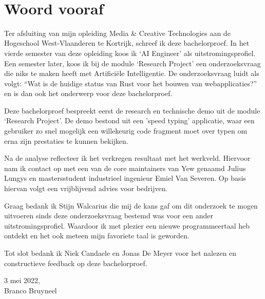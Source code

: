\documentclass[11pt, oneside]{book}
\begin{document}

\clearpage

\thispagestyle{empty}
\ %

\clearpage


\chapter*{Woord vooraf}
Ter afsluiting van mijn opleiding Media \& Creative Technologies aan de Hogeschool West-Vlaanderen
te Kortrijk, schreef ik deze bachelorproef.  In het vierde semester van deze opleiding koos ik ‘AI
Engineer’ als uitstromingsprofiel. Een semester later, koos ik bij de module ‘Research Project’ een
onderzoeksvraag die niks te maken heeft met Artificiële Intelligentie. De onderzoeksvraag luidt als
volgt: \enquote{Wat is de huidige status van Rust voor het bouwen van webapplicaties?} en is dan ook
het onderwerp voor deze bachelorproef. 

Deze bachelorproef bespreekt eerst de research en technische demo uit de module ‘Research Project’.
De demo bestond uit een 'speed typing' applicatie, waar een gebruiker zo snel mogelijk een
willekeurig code fragment moet over typen om erna zijn prestaties te kunnen bekijken. 

Na de analyse reflecteer ik het verkregen resultaat met het werkveld. Hiervoor nam ik contact op met
een van de core maintainers van Yew genaamd Julius Lungys en mastersstudent industrieel ingenieur
Emiel Van Severen. Op basis hiervan volgt een vrijblijvend advies voor bedrijven. 

Graag bedank ik Stijn Walcarius die mij de kans gaf om dit onderzoek te mogen uitvoeren sinds deze
onderzoeksvraag bestemd was voor een ander uitstromingsprofiel. Waardoor ik met plezier een nieuwe
programmeertaal heb ontdekt en het ook meteen mijn favoriete taal is geworden. 

Tot slot bedank ik Niek Candaele en Jonas De Meyer voor het nalezen en constructieve feedback op
deze bachelorproef.

\vspace{1em}

3 mei 2022,\\
Branco Bruyneel

\clearpage

\thispagestyle{empty}
\ %
\end{document}
